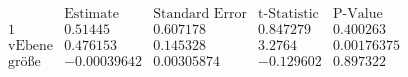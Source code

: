 \[\begin{array}{l|llll}
 \text{} & \text{Estimate} & \text{Standard Error} & \text{t-Statistic} & \text{P-Value} \\
\hline
 1 & 0.51445 & 0.607178 & 0.847279 & 0.400263 \\
 \text{vEbene} & 0.476153 & 0.145328 & 3.2764 & 0.00176375 \\
 \text{gr{\" o}{\ss}e} & -0.00039642 & 0.00305874 & -0.129602 & 0.897322 \\
\end{array}\]

